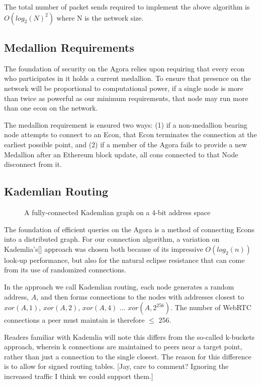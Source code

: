 \documentclass{article}
\begin{document}
The total number of packet sends required to implement the above algorithm is $O(log_2(N)^2)$ where N is the network size.

\subsection{Medallion Requirements}

The foundation of security on the Agora relies upon requiring that every econ who participates in it holds a current medallion. To ensure that presence on the network will be proportional to computational power, if a single node is more than twice as powerful as our minimum requirements, that node may run more than one econ on the network.

The medallion requirement is ensured two ways: (1) if a non-medallion bearing node attempts to connect to an Econ, that Econ terminates the connection at the earliest possible point, and (2) if a member of the Agora fails to provide a new Medallion after an Ethereum block update, all cons connected to that Node disconnect from it.

\subsection{Kademlian Routing}

\begin{figure}[htbp]
  \centering
  
  \caption{A fully-connected Kademlian graph on a 4-bit address space}
\end{figure}

The foundation of efficient queries on the Agora is a method of connecting Econs into a distributed graph. For our connection algorithm, a variation on Kademlia's[] approach was chosen both because of its impressive $O(log_2(n))$ look-up performance, but also for the natural eclipse resistance that can come from its use of randomized connections.

In the approach we call Kademlian routing, each node generates a random address, $A$, and then forms connections to the nodes with addresses closest to $xor(A, 1)$, $xor(A, 2)$, $xor(A, 4)$ ... $xor(A, 2^{256})$. The number of WebRTC connections a peer must maintain is therefore $\leq$ 256.

Readers familiar with Kademlia will note this differs from the so-called k-buckets approach, wherein k connections are maintained to peers near a target point, rather than just a connection to the single closest. The reason for this difference is to allow for signed routing tables. [Jay, care to comment? Ignoring the increased traffic I think we could support them.]
\end{document}
